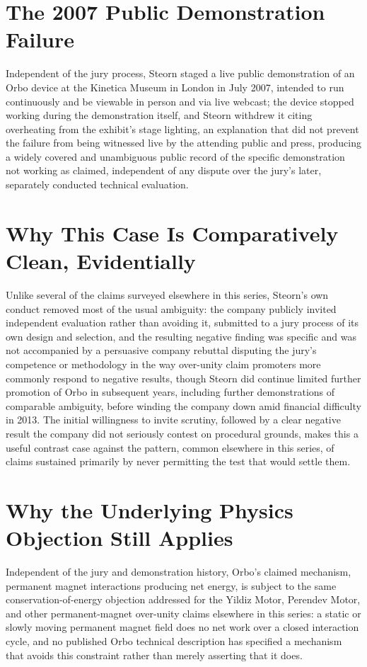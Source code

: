 \documentclass[11pt]{article}
\begin{document}
\section{The 2007 Public Demonstration Failure}

Independent of the jury process, Steorn staged a live public demonstration of an Orbo device at the Kinetica Museum in London in July 2007, intended to run continuously and be viewable in person and via live webcast; the device stopped working during the demonstration itself, and Steorn withdrew it citing overheating from the exhibit's stage lighting, an explanation that did not prevent the failure from being witnessed live by the attending public and press, producing a widely covered and unambiguous public record of the specific demonstration not working as claimed, independent of any dispute over the jury's later, separately conducted technical evaluation.

\section{Why This Case Is Comparatively Clean, Evidentially}

Unlike several of the claims surveyed elsewhere in this series, Steorn's own conduct removed most of the usual ambiguity: the company publicly invited independent evaluation rather than avoiding it, submitted to a jury process of its own design and selection, and the resulting negative finding was specific and was not accompanied by a persuasive company rebuttal disputing the jury's competence or methodology in the way over-unity claim promoters more commonly respond to negative results, though Steorn did continue limited further promotion of Orbo in subsequent years, including further demonstrations of comparable ambiguity, before winding the company down amid financial difficulty in 2013. The initial willingness to invite scrutiny, followed by a clear negative result the company did not seriously contest on procedural grounds, makes this a useful contrast case against the pattern, common elsewhere in this series, of claims sustained primarily by never permitting the test that would settle them.

\section{Why the Underlying Physics Objection Still Applies}

Independent of the jury and demonstration history, Orbo's claimed mechanism, permanent magnet interactions producing net energy, is subject to the same conservation-of-energy objection addressed for the Yildiz Motor, Perendev Motor, and other permanent-magnet over-unity claims elsewhere in this series: a static or slowly moving permanent magnet field does no net work over a closed interaction cycle, and no published Orbo technical description has specified a mechanism that avoids this constraint rather than merely asserting that it does.
\end{document}
